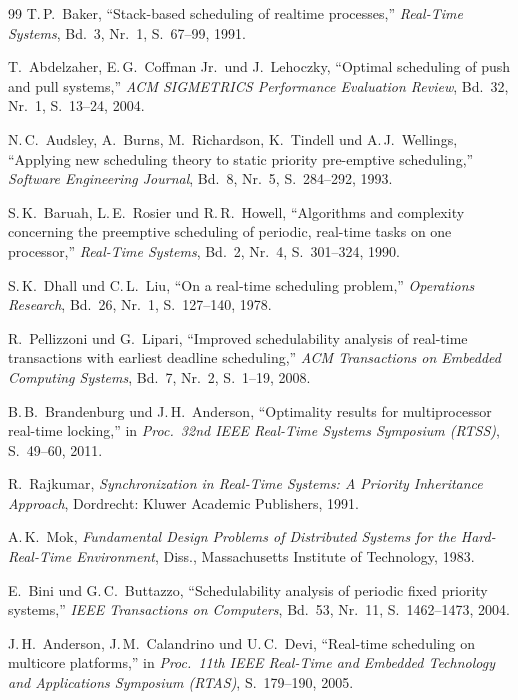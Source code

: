 ﻿\documentclass[a4paper,12pt]{article}
\theoremstyle{definition}
\begin{document}
\begin{thebibliography}{99}
		T.\,P.\ Baker,
		``Stack-based scheduling of realtime processes,''
		\textit{Real-Time Systems}, Bd.~3, Nr.~1, S.~67--99, 1991.

		T.\ Abdelzaher, E.\,G.\ Coffman Jr.\ und J.\ Lehoczky,
		``Optimal scheduling of push and pull systems,''
		\textit{ACM SIGMETRICS Performance Evaluation Review}, Bd.~32, Nr.~1, S.~13--24, 2004.

		N.\,C.\ Audsley, A.\ Burns, M.\ Richardson, K.\ Tindell und A.\,J.\ Wellings,
		``Applying new scheduling theory to static priority pre-emptive scheduling,''
		\textit{Software Engineering Journal}, Bd.~8, Nr.~5, S.~284--292, 1993.

		S.\,K.\ Baruah, L.\,E.\ Rosier und R.\,R.\ Howell,
		``Algorithms and complexity concerning the preemptive scheduling of periodic,
		real-time tasks on one processor,''
		\textit{Real-Time Systems}, Bd.~2, Nr.~4, S.~301--324, 1990.

		S.\,K.\ Dhall und C.\,L.\ Liu,
		``On a real-time scheduling problem,''
		\textit{Operations Research}, Bd.~26, Nr.~1, S.~127--140, 1978.

		R.\ Pellizzoni und G.\ Lipari,
		``Improved schedulability analysis of real-time transactions with earliest deadline scheduling,''
		\textit{ACM Transactions on Embedded Computing Systems}, Bd.~7, Nr.~2, S.~1--19, 2008.

		B.\,B.\ Brandenburg und J.\,H.\ Anderson,
		``Optimality results for multiprocessor real-time locking,''
		in \textit{Proc.\ 32nd IEEE Real-Time Systems Symposium (RTSS)}, S.~49--60, 2011.

		R.\ Rajkumar,
		\textit{Synchronization in Real-Time Systems: A Priority Inheritance Approach},
		Dordrecht: Kluwer Academic Publishers, 1991.

		A.\,K.\ Mok,
		\textit{Fundamental Design Problems of Distributed Systems for the Hard-Real-Time Environment},
		Diss., Massachusetts Institute of Technology, 1983.

		E.\ Bini und G.\,C.\ Buttazzo,
		``Schedulability analysis of periodic fixed priority systems,''
		\textit{IEEE Transactions on Computers}, Bd.~53, Nr.~11, S.~1462--1473, 2004.

		J.\,H.\ Anderson, J.\,M.\ Calandrino und U.\,C.\ Devi,
		``Real-time scheduling on multicore platforms,''
		in \textit{Proc.\ 11th IEEE Real-Time and Embedded Technology and Applications Symposium (RTAS)},
		S.~179--190, 2005.


\end{thebibliography}
\end{document}
